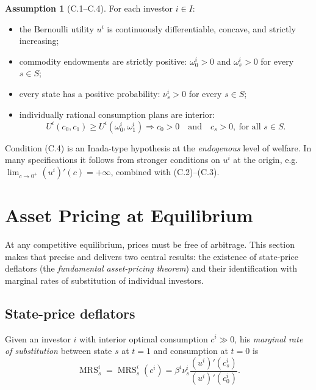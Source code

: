 \documentclass[11pt,a4paper,oneside]{book}
\def\geq{\geqslant}
\def\et{\quad \text{and} \quad}
\DeclareMathOperator{\MRS}{MRS}
\theoremstyle{plain}
\theoremstyle{definition}
\newtheorem{assumption}[theorem]{Assumption}
\theoremstyle{remark}
\numberwithin{equation}{chapter}
\begin{document}
\begin{assumption}[C.1--C.4]\label{ass:C}
For each investor $i \in I$:
\begin{itemize}
  \item[\textup{(C.1)}] the Bernoulli utility $u^i$ is continuously differentiable, concave, and strictly increasing;
  \item[\textup{(C.2)}] commodity endowments are strictly positive: $\omega^i_0 > 0$ and $\omega^i_s > 0$ for every $s \in S$;
  \item[\textup{(C.3)}] every state has a positive probability: $\nu^i_s > 0$ for every $s \in S$;
  \item[\textup{(C.4)}] individually rational consumption plans are interior:
  \begin{equation*}
    U^i(c_0, c_1) \geq U^i(\omega^i_0, \omega^i_1)
    \Longrightarrow
    c_0 > 0 \et c_s > 0, \ \text{for all $s\in S$}.
  \end{equation*}
\end{itemize}
\end{assumption}

Condition (C.4) is an Inada-type hypothesis at the \emph{endogenous} level of welfare.
In many specifications it follows from stronger conditions on $u^i$ at the origin, e.g.\ $\lim_{c \to 0^+} (u^i)'(c) = +\infty$, combined with (C.2)--(C.3).

\section{Asset Pricing at Equilibrium}
\label{sec:asset-pricing}

At any competitive equilibrium, prices must be free of arbitrage.
This section makes that precise and delivers two central results: the existence of state-price deflators (the \emph{fundamental asset-pricing theorem}) and their identification with marginal rates of substitution of individual investors.

\subsection{State-price deflators}

Given an investor $i$ with interior optimal consumption $c^i \gg 0$, his \emph{marginal rate of substitution} between state $s$ at $t=1$ and consumption at $t=0$ is
\begin{equation}\label{eq:mrs-def}
  \MRS^i_s = \MRS^i_s(c^i)
  = \beta^i \nu^i_s \frac{(u^i)'(c^i_s)}{(u^i)'(c^i_0)}.
\end{equation}
\end{document}

